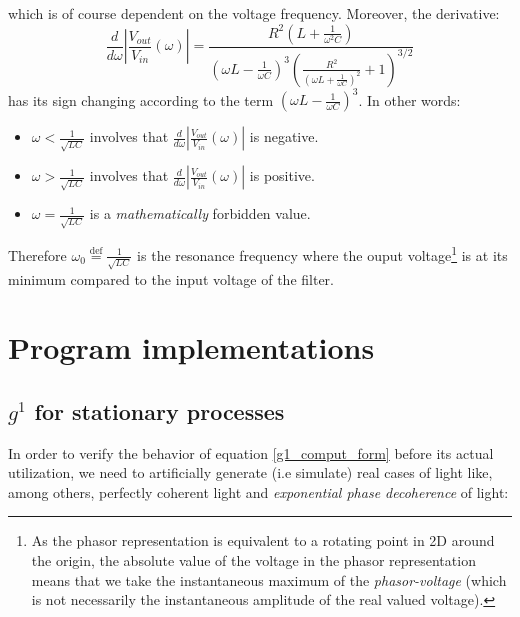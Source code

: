 \documentclass[10pt]{report}
\begin{document}
which is of course dependent on the voltage frequency. Moreover, the derivative:
\begin{equation}
\frac{d}{d\omega} \left\vert \frac{V_{out}}{V_{in}}(\omega) \right\vert = \frac{R^2\left(L + \frac{1}{\omega^2C}\right)}{\left(\omega L - \frac{1}{\omega C}\right)^3\left(\frac{R^2}{\left(\omega L + \frac{1}{\omega C}\right)^2} + 1\right)^{3/2}}
\end{equation}
has its sign changing according to the term $\left(\omega L - \frac{1}{\omega C}\right)^3$. In other words:
\begin{itemize}
	\item $\omega < \frac{1}{\sqrt{LC}}$ involves that $\frac{d}{d\omega} \left\vert \frac{V_{out}}{V_{in}}(\omega) \right\vert$ is negative.
	\item $\omega > \frac{1}{\sqrt{LC}}$ involves that $\frac{d}{d\omega} \left\vert \frac{V_{out}}{V_{in}}(\omega) \right\vert$ is positive.
	\item $\omega = \frac{1}{\sqrt{LC}}$ is a \textit{mathematically} forbidden value.
\end{itemize}
Therefore $\omega_0 \stackrel{\text{def}}{=} \frac{1}{\sqrt{LC}}$ is the resonance frequency where the ouput voltage\footnote{As the phasor representation is equivalent to a rotating point in 2D around the origin, the absolute value of the voltage in the phasor representation means that we take the instantaneous maximum of the \textit{phasor-voltage} (which is not necessarily the instantaneous amplitude of the real valued voltage).} is at its minimum compared to the input voltage of the filter.

\chapter{Program implementations}
\label{prog_impl}

\section{$g^1$ for stationary processes}

In order to verify the behavior of equation \eqref{g1_comput_form} before its actual utilization, we need to artificially generate (i.e simulate) real cases of light like, among others, perfectly coherent light and \textit{exponential phase decoherence} of light:
\end{document}
